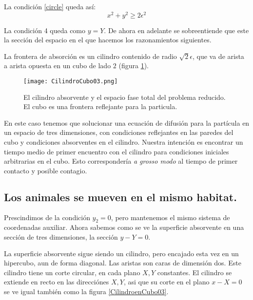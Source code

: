 \documentclass[letterpaper,10pt]{article}
\begin{document}
La condición \ref{circle} queda así:
\begin{equation}
x^2+y^2 \geq 2 \epsilon^2
\end{equation}

La condición 4 queda como $y=Y$.  De ahora
en adelante  se sobreentiende que este  la sección del
espacio en el que hacemos los razonamientos siguientes.

La frontera de absorción es un cilindro
contenido de radio $\sqrt{2} \epsilon$, que va de 
arista a arista opuesta en un cubo de lado $2$
(figura \ref{CilindroenCubo01}).

\begin{figure}
\centering
\texttt{[image: CilindroCubo03.png]}
\caption{El cilindro absorvente y el espacio fase total
del problema reducido. El cubo es
una frontera reflejante para la particula.}
\label{CilindroenCubo01}
\end{figure}

En este caso tenemos que solucionar una ecuación de
difusión para la partícula en un espacio de
tres dimensiones, con condiciones
reflejantes en las paredes del cubo y condiciones
absorventes en el cilindro. Nuestra intención es encontrar
un tiempo medio de primer encuentro con el cilindro
para condiciones iniciales arbitrarias en el cubo. 
Esto correspondería \emph{a grosso modo} al tiempo de
primer contacto y posible contagio.


\subsection{Los animales se mueven en el mismo habitat.}

Prescindimos de la condición $y_2=0$, pero mantenemos
el mismo sistema de coordenadas auxiliar. Ahora
sabemos como se ve la superficie absorvente
en una sección de tres dimensiones, la sección $y-Y=0$. 

La superficie absorvente sigue siendo un cilindro, pero
encajado esta vez en un hipercubo, aun de forma diagonal.
Las aristas son caras de dimensión dos. 
Este cilindro tiene un corte circular, en cada plano
$X,Y$ constantes. El cilindro se extiende en recto
en las direcciónes $X,Y$, asi que su corte en el plano
$x-X=0$ se ve igual también como la figura 
\ref{CilindroenCubo03}.
\end{document}
